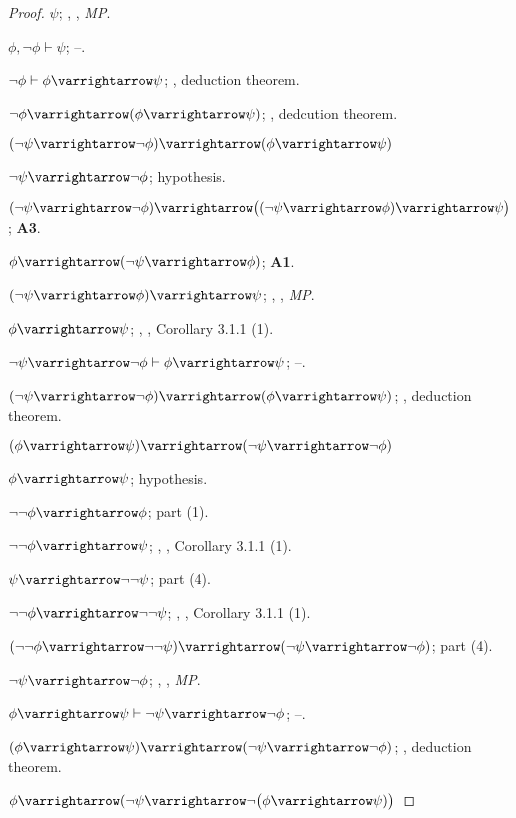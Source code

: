 \documentclass[10pt]{article}
\let\to=\varrightarrow
\def\Aone#1#2{#1\to(#2\to#1)}
\def\Athree#1#2{(\neg#2\to\neg#1)\to\bigl((\neg#2\to#1)\to#2\bigr)}
\begin{document}
\begin{proof}
            \item $\psi$; , , \textit{MP}.
            \item $\phi,\neg\phi\vdash\psi$; --.
            \item $\neg\phi\vdash\phi\to\psi$; , deduction theorem.
            \item $\neg\phi\to(\phi\to\psi)$; , dedcution theorem.
        \eenum
        \item $(\neg\psi\to\neg\phi)\to(\phi\to\psi)$
        \benum
            \item $\neg\psi\to\neg\phi$; hypothesis.
            \item $\Athree\phi\psi$; \textbf{A3}.
            \item $\Aone\phi{\neg\psi}$; \textbf{A1}.
            \item $(\neg\psi\to\phi)\to\psi$; , , \textit{MP}.
            \item $\phi\to\psi$; , , Corollary 3.1.1 (1).
            \item $\neg\psi\to\neg\phi\vdash\phi\to\psi$; --.
            \item $(\neg\psi\to\neg\phi)\to(\phi\to\psi)$; , deduction theorem.
        \eenum
        \item $(\phi\to\psi)\to(\neg\psi\to\neg\phi)$
        \benum
            \item $\phi\to\psi$; hypothesis.
            \item $\neg\neg\phi\to\phi$; part (1).
            \item $\neg\neg\phi\to\psi$; , , Corollary 3.1.1 (1).
            \item $\psi\to\neg\neg\psi$; part (4).
            \item $\neg\neg\phi\to\neg\neg\psi$; , , Corollary 3.1.1 (1).
            \item $(\neg\neg\phi\to\neg\neg\psi)\to(\neg\psi\to\neg\phi)$; part (4).
            \item $\neg\psi\to\neg\phi$; , , \textit{MP}.
            \item $\phi\to\psi\vdash\neg\psi\to\neg\phi$; --.
            \item $(\phi\to\psi)\to(\neg\psi\to\neg\phi)$; , deduction theorem.
        \eenum
        \item $\phi\to(\neg\psi\to\neg\bigl(\phi\to\psi)\bigr)$

\end{proof}
\end{document}

